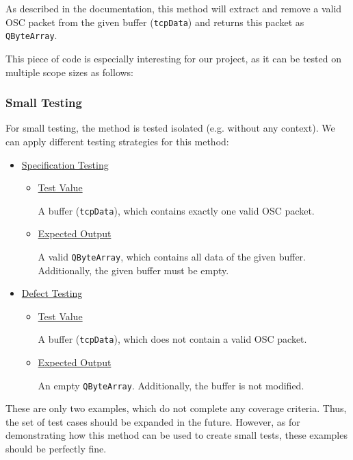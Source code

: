 \documentclass{scrreprt}
\begin{document}
As described in the documentation, this method will extract and remove a valid OSC packet from the given buffer (\texttt{tcpData}) and returns this packet as \texttt{QByteArray}.

This piece of code is especially interesting for our project, as it can be tested on multiple scope sizes as follows:

\subsubsection{Small Testing}

For small testing, the method is tested isolated (e.g. without any context). We can apply different testing strategies for this method:

\begin{itemize}
	\item[] \underline{Specification Testing}
	
	\begin{itemize}
		\item[] \underline{Test Value}
		
		A buffer (\texttt{tcpData}), which contains exactly one valid OSC packet.
		
		\item[] \underline{Expected Output}
		
		A valid \texttt{QByteArray}, which contains all data of the given buffer. Additionally, the given buffer must be empty.
	\end{itemize}

	\item[] \underline{Defect Testing}
	
	\begin{itemize}
		\item[] \underline{Test Value}
		
		A buffer (\texttt{tcpData}), which does not contain a valid OSC packet.
		
		\item[] \underline{Expected Output}
		
		An empty \texttt{QByteArray}. Additionally, the buffer is not modified.
	\end{itemize}
\end{itemize}

These are only two examples, which do not complete any coverage criteria. Thus, the set of test cases should be expanded in the future. However, as for demonstrating how this method can be used to create small tests, these examples should be perfectly fine.
\end{document}
